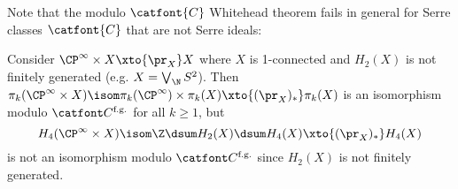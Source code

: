 Note that the modulo $\catfont{C}$ Whitehead theorem fails in general for Serre classes $\catfont{C}$ that are not Serre ideals:
\begin{example}
	Consider $\CP^\infty \times X \xto{\pr_X} X$ where $X$ is 1-connected and $H_2(X)$ is not finitely generated (e.g. $X = \bigvee_{\N} S^2$).
	Then $\pi_k(\CP^\infty \times X) \isom \pi_k(\CP^\infty) \times \pi_k(X) \xto{(\pr_X)_*} \pi_k(X)$ is an isomorphism modulo $\Cfg$ for all $k \geq 1$, but
	\begin{equation*}
		H_4(\CP^\infty \times X) \isom \Z \dsum H_2(X) \dsum H_4(X) \xto{(\pr_X)_*} H_4(X)
	\end{equation*}
	is not an isomorphism modulo $\Cfg$ since $H_2(X)$ is not finitely generated.
\end{example}

